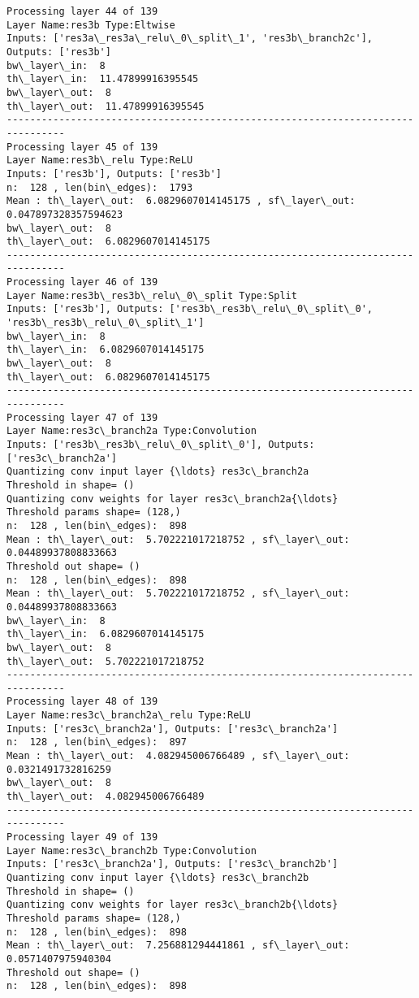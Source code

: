 \documentclass[11pt]{article}
\begin{document}
\begin{Verbatim}[commandchars=\\\{\}]
Processing layer 44 of 139
Layer Name:res3b Type:Eltwise
Inputs: ['res3a\_res3a\_relu\_0\_split\_1', 'res3b\_branch2c'], Outputs: ['res3b']
bw\_layer\_in:  8
th\_layer\_in:  11.47899916395545
bw\_layer\_out:  8
th\_layer\_out:  11.47899916395545
--------------------------------------------------------------------------------
Processing layer 45 of 139
Layer Name:res3b\_relu Type:ReLU
Inputs: ['res3b'], Outputs: ['res3b']
n:  128 , len(bin\_edges):  1793
Mean : th\_layer\_out:  6.0829607014145175 , sf\_layer\_out:  0.047897328357594623
bw\_layer\_out:  8
th\_layer\_out:  6.0829607014145175
--------------------------------------------------------------------------------
Processing layer 46 of 139
Layer Name:res3b\_res3b\_relu\_0\_split Type:Split
Inputs: ['res3b'], Outputs: ['res3b\_res3b\_relu\_0\_split\_0', 'res3b\_res3b\_relu\_0\_split\_1']
bw\_layer\_in:  8
th\_layer\_in:  6.0829607014145175
bw\_layer\_out:  8
th\_layer\_out:  6.0829607014145175
--------------------------------------------------------------------------------
Processing layer 47 of 139
Layer Name:res3c\_branch2a Type:Convolution
Inputs: ['res3b\_res3b\_relu\_0\_split\_0'], Outputs: ['res3c\_branch2a']
Quantizing conv input layer {\ldots} res3c\_branch2a
Threshold in shape= ()
Quantizing conv weights for layer res3c\_branch2a{\ldots}
Threshold params shape= (128,)
n:  128 , len(bin\_edges):  898
Mean : th\_layer\_out:  5.702221017218752 , sf\_layer\_out:  0.04489937808833663
Threshold out shape= ()
n:  128 , len(bin\_edges):  898
Mean : th\_layer\_out:  5.702221017218752 , sf\_layer\_out:  0.04489937808833663
bw\_layer\_in:  8
th\_layer\_in:  6.0829607014145175
bw\_layer\_out:  8
th\_layer\_out:  5.702221017218752
--------------------------------------------------------------------------------
Processing layer 48 of 139
Layer Name:res3c\_branch2a\_relu Type:ReLU
Inputs: ['res3c\_branch2a'], Outputs: ['res3c\_branch2a']
n:  128 , len(bin\_edges):  897
Mean : th\_layer\_out:  4.082945006766489 , sf\_layer\_out:  0.0321491732816259
bw\_layer\_out:  8
th\_layer\_out:  4.082945006766489
--------------------------------------------------------------------------------
Processing layer 49 of 139
Layer Name:res3c\_branch2b Type:Convolution
Inputs: ['res3c\_branch2a'], Outputs: ['res3c\_branch2b']
Quantizing conv input layer {\ldots} res3c\_branch2b
Threshold in shape= ()
Quantizing conv weights for layer res3c\_branch2b{\ldots}
Threshold params shape= (128,)
n:  128 , len(bin\_edges):  898
Mean : th\_layer\_out:  7.256881294441861 , sf\_layer\_out:  0.0571407975940304
Threshold out shape= ()
n:  128 , len(bin\_edges):  898

\end{Verbatim}
\end{document}
